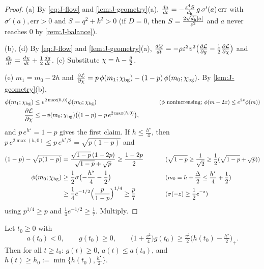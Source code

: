 \begin{proof}
(a) By \cref{eq:J-flow} and \cref{lem:J-geometry}(a), $\ddt{a}=-\frac{\initscale^4S}{d_{\mathrm h}}\,g\,\sigma'(a)\,\mathrm{err}$ with $\sigma'(a),\mathrm{err}>0$ and $S=q^2+k^2>0$ (if $D=0$, then $S=\frac{2\sqrt{d_{\mathrm h}}|a|}{\varepsilon^2}$ and $a$ never reaches $0$ by \cref{rem:J-balance}).

(b), (d) By \cref{eq:J-flow} and \cref{lem:J-geometry}(a), $\ddt{Q}=-\rho\initscale^2v^2\bigl(\pd{\mathcal L}{g}-\frac{1}{2}\pd{\mathcal L}{\cnt}\bigr)$ and
$\ddt{h}=\ddt{\cnt}+\frac{1}{2}\ddt{g}$. (c) Substitute $\chi=h-\frac{g}{2}$.

(e) $m_1=m_0-2h$ and $\pd{\mathcal L}{\cnt}=p\,\phi(m_1;\cbg)-(1-p)\,\phi(m_0;\cbg)$. By \cref{lem:J-geometry}(b),
\begin{alignat*}{2}
 \phi(m_1;\cbg)&\le e^{2\max(h,0)}\phi(m_0;\cbg) &\qquad& \why{$\phi$ nonincreasing; $\phi(m-2x)\le e^{2x}\phi(m)$}\\
 \pd{\mathcal L}{\cnt}&\le-\phi(m_0;\cbg)\bigl((1-p)-p\,e^{2\max(h,0)}\bigr),
\end{alignat*}
and $p\,e^{h^\star}=1-p$ gives the first claim. If $h\le\frac{h^\star}{4}$, then $p\,e^{2\max(h,0)}\le p\,e^{h^\star/2}=\sqrt{p(1-p)}$ and
\begin{alignat*}{2}
 (1-p)-\sqrt{p(1-p)}&=\frac{\sqrt{1-p}\,(1-2p)}{\sqrt{1-p}+\sqrt p}\ge\frac{1-2p}{2} &\qquad& \why{$\sqrt{1-p}\ge\tfrac{1}{\sqrt2}\ge\tfrac{1}{2}(\sqrt{1-p}+\sqrt p)$}\\
 \phi(m_0;\cbg)&\ge\tfrac{1}{2}\sigma\bigl(-\tfrac{h^\star}{4}-\tfrac{1}{2}\bigr) && \why{$m_0=h+\tfrac{\Delta}{2}\le\tfrac{h^\star}{4}+\tfrac{1}{2}$}\\
 &\ge\tfrac{1}{4}e^{-1/2}\Bigl(\frac{p}{1-p}\Bigr)^{1/4}\ge\frac{p}{7} && \why{$\sigma(-z)\ge\tfrac{1}{2}e^{-z}$}
\end{alignat*}
using $p^{1/4}\ge p$ and $\frac{1}{4}e^{-1/2}\ge\frac{1}{7}$. Multiply.
\end{proof}

\begin{lemma}
\label{lem:J-align}
Let $t_0\ge0$ with
\[
 a(t_0)<0,\qquad g(t_0)\ge0,\qquad \bigl(1+\tfrac{v^2}{4}\bigr)g(t_0)\ge\tfrac{v^2}{2}\bigl(h(t_0)-\tfrac{h^\star}{2}\bigr)_+ .
\]
Then for all $t\ge t_0$: $g(t)\ge0$, $a(t)\le a(t_0)$, and $h(t)\ge h_0:=\min\{h(t_0),\frac{h^\star}{2}\}$.
\end{lemma}

